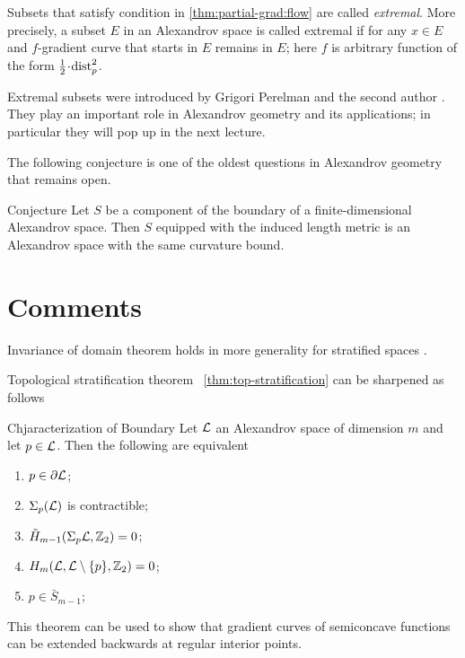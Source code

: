 Subsets that satisfy condition in \ref{thm:partial-grad:flow} are called \emph{extremal}.
More precisely, a subset $E$ in an Alexandrov space is called extremal if for any $x\in E$
and $f$-gradient curve that starts in $E$ remains in $E$;
here $f$ is arbitrary function of the form $\tfrac12\cdot \distfun_p^2$.

Extremal subsets were introduced by Grigori Perelman and the second author \cite{perelman-petrunin}.
They play an important role in Alexandrov geometry and its applications;
in particular they will pop up in the next lecture.

The following conjecture is one of the oldest questions in Alexandrov geometry that remains open.

\begin{thm}{Conjecture}
Let $S$ be a component of the boundary of a finite-dimensional Alexandrov space.
Then $S$ equipped with the induced length metric is an Alexandrov space with the same curvature bound.
\end{thm}

\section{Comments}

Invariance of domain theorem holds in more generality for stratified spaces \cite[Theorem 3.2]{kapovitch-zhu}.

Topological stratification theorem ~\ref{thm:top-stratification} can be sharpened as follows

\begin{thm}{Chjaracterization of Boundary}\label{thm:boundary-kd}
Let $\mathcal{L}$ an Alexandrov space of dimension $m$  and let $p \in \mathcal{L}$.
Then the following are equivalent
\begin{enumerate}
\item \label{item-boundary} $p\in \partial \mathcal{L}$;
\item\label{item-contractible} $\Sigma_p(\mathcal{L})$ is contractible;
\item \label{item-space-dir-homology} $\tilde H_{m-1}(\Sigma_p \mathcal{L},\mathbb{Z}_2)= 0$;
\item \label{item-local-homology} $H_m( \mathcal{L},\mathcal{L}\setminus \{p\},\mathbb{Z}_2)= 0$;
\item \label{item-closure-top-strata}  $p\in \bar S_{m-1}$;



\end{enumerate}
\end{thm}


This theorem can be used to show that gradient curves of semiconcave functions can be extended backwards at regular interior points.


